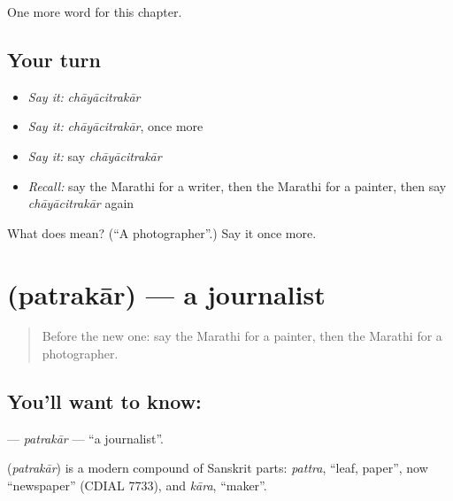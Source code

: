 \begin{grammarlens}[title={What you've built}]
One more word for this chapter.
\end{grammarlens}

\subsection*{Your turn}
\begin{itemize}
\raggedright
  \item \emph{Say it:} \emph{chāyācitrakār}
  \item \emph{Say it:} \emph{chāyācitrakār}, once more
  \item \emph{Say it:} say \emph{chāyācitrakār}
  \item \emph{Recall:} say the Marathi for a writer, then the Marathi for a painter, then say \emph{chāyācitrakār} again
\end{itemize}

\begin{tcolorbox}[breakable,colback=teal!4,colframe=teal!35!black,title={Before you move on}]
What does  mean? (\textquotedblleft{}A photographer\textquotedblright{}.) Say it once more.
\end{tcolorbox}
\section[\texorpdfstring{\mr{पत्रकार} (patrakār)}{पत्रकार (patrakār)}]{ (patrakār) — a journalist}

\label{lesson:MR-C180-patrakar}



\begin{quote}
Before the new one: say the Marathi for a painter, then the Marathi for a photographer.
\end{quote}

\subsection*{You'll want to know: }
\textbf{} — \emph{patrakār} — \textquotedblleft{}a journalist\textquotedblright{}.

\begin{cousinweb}
\textbf{} (\emph{patrakār}) is a modern compound of Sanskrit parts: \emph{pattra}, \textquotedblleft{}leaf, paper\textquotedblright{}, now \textquotedblleft{}newspaper\textquotedblright{} (CDIAL 7733), and \emph{kāra}, \textquotedblleft{}maker\textquotedblright{}.
\end{cousinweb}

